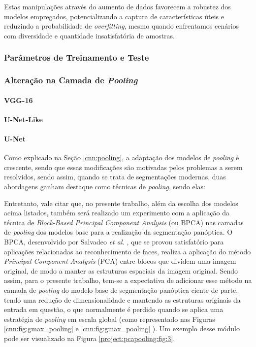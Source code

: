 Estas manipulações através do aumento de dados favorecem a robustez dos modelos empregados, potencializando a captura de características úteis e reduzindo a probabilidade de \textit{overfitting}, mesmo quando enfrentamos cenários com diversidade e quantidade insatisfatória de amostras.

\subsubsection{Parâmetros de Treinamento e Teste}
\label{project:params}


\subsubsection{Alteração na Camada de \textit{Pooling}}
\label{project:change_pooling}


\paragraph{VGG-16}

\paragraph{U-Net-Like}

\paragraph{U-Net}

Como explicado na Seção \ref{cnn:pooling}, a adaptação dos modelos de \textit{pooling} é crescente, sendo que essas modificações são motivadas pelos problemas a serem resolvidos, sendo assim, quando se trata de segmentações modernas, duas abordagens ganham destaque como técnicas de \textit{pooling}, sendo elas:

Entretanto, vale citar que, no presente trabalho, além da escolha dos modelos acima listados, também será realizado um experimento com a aplicação da técnica de \textit{Block-Based Principal Component Analysis} (ou BPCA) nas camadas de \textit{pooling} dos modelos base para a realização da segmentação panóptica. O BPCA, desenvolvido por Salvadeo \textit{et al.} \cite{Salvadeo2011}, que se provou satisfatório para aplicações relacionadas ao reconhecimento de faces, realiza a aplicação do método \textit{Principal Component Analysis} (PCA) entre blocos que dividem uma imagem original, de modo a manter as estruturas espaciais da imagem original. Sendo assim, para o presente trabalho, tem-se a expectativa de adicionar esse método na camada de \textit{pooling} do modelo base  de segmentação panóptica ciente de parte, tendo uma redução de dimensionalidade e mantendo as estruturas originais da entrada em questão, o que normalmente é perdido quando se aplica uma estratégia de \textit{pooling} em escala global (como representado nas Figuras \ref{cnn:fig:gmax_pooling} e \ref{cnn:fig:gmax_pooling} ).  Um exemplo desse módulo pode ser visualizado na Figura \ref{project:pcapooling:fig:3}.

